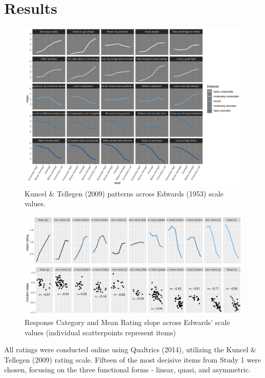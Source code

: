 \documentclass[
  ,jou]{apa6}
\begin{document}
\hypertarget{results-1}{%
\section{Results}\label{results-1}}

\begin{figure}
\centering
\includegraphics{KuncelTellegen_files/figure-latex/Figure2-1.pdf}
\caption{\label{fig:Figure2}Kuncel \& Tellegen (2009) patterns across Edwards (1953) scale values.}
\end{figure}

\begin{figure}
\centering
\includegraphics{KuncelTellegen_files/figure-latex/lastone-1.pdf}
\caption{\label{fig:lastone}Response Category and Mean Rating slope across Edwards' scale values (individual scatterpoints represent items)}
\end{figure}

All ratings were conducted online using Qualtrics (2014), utilizing the Kuncel \& Tellegen (2009) rating scale. Fifteen of the most decisive items from Study 1 were chosen, focusing on the three functional forms - linear, quasi, and asymmetric.
\end{document}
